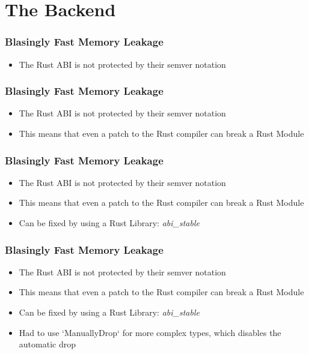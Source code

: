 \documentclass{beamer}
\begin{document}


\section{The Backend}
\SectionPage

\begin{frame}
  \frametitle{Blasingly Fast Memory Leakage }
  \begin{itemize}
    \item The Rust ABI is not protected by their semver notation
  \end{itemize}
\end{frame}

\begin{frame}
  \frametitle{Blasingly Fast Memory Leakage }
  \begin{itemize}
    \item The Rust ABI is not protected by their semver notation
    \item This means that even a patch to the Rust compiler can break a
      Rust Module
  \end{itemize}
\end{frame}

\begin{frame}
  \frametitle{Blasingly Fast Memory Leakage }
  \begin{itemize}
    \item The Rust ABI is not protected by their semver notation
    \item This means that even a patch to the Rust compiler can break a
      Rust Module
    \item Can be fixed by using a Rust Library: \textit{abi\_stable}
  \end{itemize}
\end{frame}

\begin{frame}
  \frametitle{Blasingly Fast Memory Leakage }
  \begin{itemize}
    \item The Rust ABI is not protected by their semver notation
    \item This means that even a patch to the Rust compiler can break a
      Rust Module
    \item Can be fixed by using a Rust Library: \textit{abi\_stable}
    \item Had to use `ManuallyDrop` for more complex types, which disables
      the automatic drop
  \end{itemize}
\end{frame}
\end{document}
